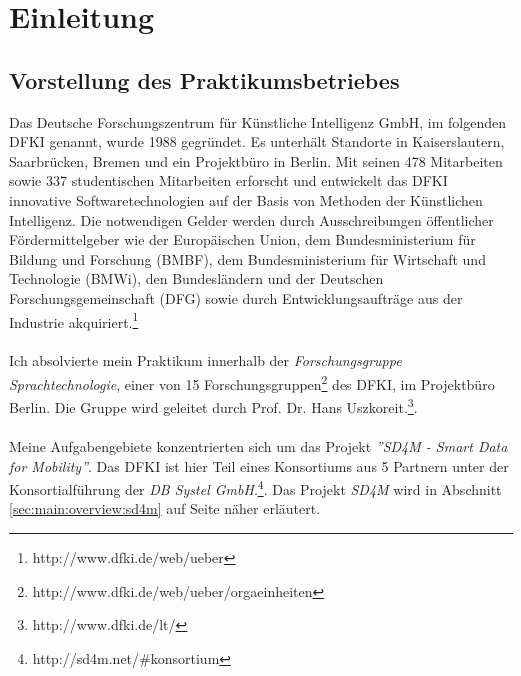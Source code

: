 \chapter{Einleitung}
\label{sec:intro}
\section{Vorstellung des Praktikumsbetriebes}
\label{sec:intro:dfki}
Das Deutsche Forschungszentrum für Künstliche Intelligenz GmbH, im folgenden DFKI genannt, wurde 1988 gegründet.
Es unterhält Standorte in Kaiserslautern, Saarbrücken, Bremen und ein Projektbüro in Berlin.
Mit seinen 478 Mitarbeiten sowie 337 studentischen Mitarbeiten erforscht und entwickelt das DFKI innovative Softwaretechnologien auf der Basis von Methoden der Künstlichen Intelligenz.
Die notwendigen Gelder werden durch Ausschreibungen öffentlicher Fördermittelgeber wie der Europäischen Union, dem Bundesministerium für Bildung und Forschung (BMBF), dem Bundesministerium für Wirtschaft und Technologie (BMWi), den Bundesländern und der Deutschen Forschungsgemeinschaft (DFG) sowie durch Entwicklungsaufträge aus der Industrie akquiriert.\footnote{http://www.dfki.de/web/ueber}
\\\\
Ich absolvierte mein Praktikum innerhalb der \textit{Forschungsgruppe Sprachtechnologie}, einer von 15 Forschungsgruppen\footnote{http://www.dfki.de/web/ueber/orgaeinheiten} des DFKI, im Projektbüro Berlin. Die Gruppe wird geleitet durch Prof. Dr. Hans Uszkoreit.\footnote{http://www.dfki.de/lt/}.
\\\\
Meine Aufgabengebiete konzentrierten sich um das Projekt \textit{''SD4M - Smart Data for Mobility''}. Das DFKI ist hier Teil eines Konsortiums aus 5 Partnern unter der Konsortialführung der \textit{DB Systel GmbH}.\footnote{http://sd4m.net/#konsortium}. 
Das Projekt \textit{SD4M} wird in Abschnitt \ref{sec:main:overview:sd4m} auf Seite \pageref{sec:main:overview:sd4m} näher erläutert.
